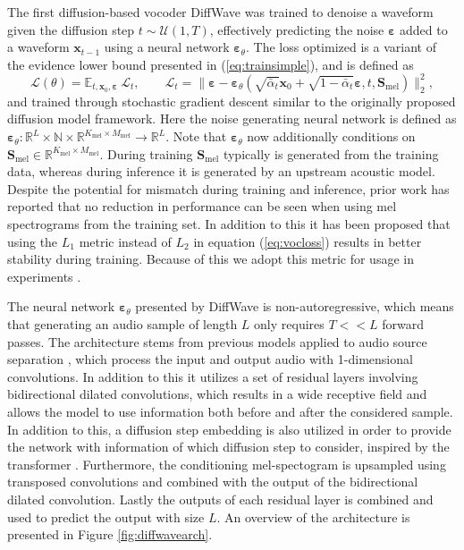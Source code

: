 \documentclass{report}
\begin{document}
The first diffusion-based vocoder DiffWave \cite{kong2020diffwave} was trained to denoise a waveform given the diffusion step $t \sim \mathcal{U}(1, T)$, effectively predicting the noise $\bm{\varepsilon}$ added to a waveform $\bm{x}_{t-1}$ using a neural network $\bm{\varepsilon}_{\theta}$. The loss optimized is a variant of the evidence lower bound presented in (\ref{eq:trainsimple}), and is defined as
\begin{equation} \label{eq:vocloss}
    \mathcal{L}(\theta) = \mathbb{E}_{t, \bm{x}_0, \bm{\varepsilon}} \ \mathcal{L}_{t}, \qquad \mathcal{L}_{t} = \| \bm{\varepsilon} - \bm{\varepsilon}_{\theta}(\sqrt{\bar{\alpha}_t} \bm{x}_0 + \sqrt{1 - \bar{\alpha}_t}\bm{\varepsilon}, t, \bm{S}_{\text{mel}}) \|_2^2,
\end{equation}
and trained through stochastic gradient descent similar to the originally proposed diffusion model framework. Here the noise generating neural network is defined as $\bm{\varepsilon}_{\theta}: \mathbb{R}^L \times \mathbb{N} \times \mathbb{R}^{K_{\text{mel}} \times M_{\text{mel}}} \rightarrow \mathbb{R}^L$. Note that $\bm{\varepsilon}_{\theta}$ now additionally conditions on $\bm{S}_{\text{mel}} \in \mathbb{R}^{K_{\text{mel}} \times M_{\text{mel}}}$. During training $\bm{S}_{\text{mel}}$ typically is generated from the training data, whereas during inference it is generated by an upstream acoustic model. Despite the potential for mismatch during training and inference, prior work has reported that no reduction in performance can be seen when using mel spectrograms from the training set. In addition to this it has been proposed that using the $L_1$ metric instead of $L_2$ in equation (\ref{eq:vocloss}) results in better stability during training. Because of this we adopt this metric for usage in experiments \cite{chen2020wavegrad}.

The neural network $\bm{\varepsilon}_{\theta}$ presented by DiffWave is non-autoregressive, which means that generating an audio sample of length $L$ only requires $T << L$ forward passes. The architecture stems from previous models applied to audio source separation \cite{rethage2018wavenet}, which process the input and output audio with 1-dimensional convolutions. In addition to this it utilizes a set of residual layers involving bidirectional dilated convolutions, which results in a wide receptive field and allows the model to use information both before and after the considered sample. In addition to this, a diffusion step embedding is also utilized in order to provide the network with information of which diffusion step to consider, inspired by the transformer \cite{vaswani2017attention}. Furthermore, the conditioning mel-spectogram is upsampled using transposed convolutions and combined with the output of the bidirectional dilated convolution. Lastly the outputs of each residual layer is combined and used to predict the output with size $L$. An overview of the architecture is presented in Figure \ref{fig:diffwavearch}.
\end{document}
